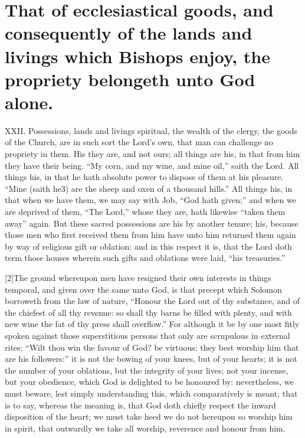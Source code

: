 \section*{That of ecclesiastical goods, and consequently of the lands and livings which Bishops enjoy, the propriety belongeth unto God alone.}

XXII. Possessions, lands and livings spiritual, the wealth of the clergy, the goods of the Church, are in such sort the Lord’s own, that man can challenge no propriety in them. His they are, and not ours; all things are his, in that from him they have their being. “My corn, and my wine, and mine oil,” saith the Lord. All things his, in that he hath absolute power to dispose of them at his pleasure. “Mine (saith he3) are the sheep and oxen of a thousand hills.” All things his, in that when we have them, we may say with Job, “God hath given;” and when we are deprived of them, “The Lord,” whose they are, hath likewise “taken  them away” again. But these sacred possessions are his by another tenure; his, because those men who first received them from him have unto him returned them again by way of religious gift or oblation: and in this respect it is, that the Lord doth term those houses wherein such gifts and oblations were laid, “his treasuries.”

[2]The ground whereupon men have resigned their own interests in things temporal, and given over the same unto God, is that precept which Solomon borroweth from the law of nature, “Honour the Lord out of thy substance, and of the chiefest of all thy revenue: so shall thy barns be filled with plenty, and with new wine the fat of thy press shall overflow.” For although it be by one most fitly spoken against those superstitious persons that only are scrupulous in external rites; “Wilt thou win the favour of God? be virtuous: they best worship him that are his followers:” it is not the bowing of your knees, but of your hearts; it is not the number of your oblations, but the integrity of your lives; not your incense, but your obedience, which God is delighted to be honoured by: nevertheless, we must beware, lest simply understanding this, which comparatively is meant; that is to say, whereas the meaning is, that God doth chiefly respect the inward disposition of the heart; we must take heed we do not hereupon so worship him in spirit, that outwardly we take all worship, reverence and honour from him.

